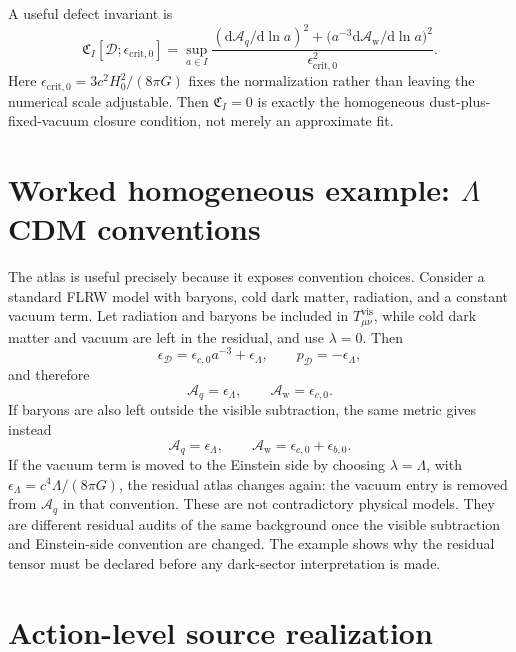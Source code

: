 \documentclass[
  aps,
  prd,
  reprint,
  superscriptaddress,
  floatfix,
  nofootinbib,
  longbibliography
]{revtex4-2}
\theoremstyle{plain}
\theoremstyle{definition}
\theoremstyle{remark}
\newcommand{\dd}{\mathrm d}
\newcommand{\D}{\mathcal D}
\newcommand{\vis}{\mathrm{vis}}
\newcommand{\crit}{\mathrm{crit}}
\newcommand{\Aq}{\mathcal A_q}
\newcommand{\Aw}{\mathcal A_{\mathrm w}}
\begin{document}
A useful defect invariant is
\begin{equation}
\boxed{
\mathfrak C_I[\D;\epsilon_{\crit,0}]
=\sup_{a\in I}
\frac{(\dd\Aq/\dd\ln a)^2+\bigl(a^{-3}\dd\Aw/\dd\ln a\bigr)^2}{\epsilon_{\crit,0}^{2}}.
}
\label{eq:defect}
\end{equation}
Here \(\epsilon_{\crit,0}=3c^2H_0^2/(8\pi G)\) fixes the normalization rather than leaving the numerical scale adjustable.  Then \(\mathfrak C_I=0\) is exactly the homogeneous dust-plus-fixed-vacuum closure condition, not merely an approximate fit.


\section{Worked homogeneous example: \texorpdfstring{\(\Lambda\)CDM}{LambdaCDM} conventions}

The atlas is useful precisely because it exposes convention choices.  Consider a standard FLRW model with baryons, cold dark matter, radiation, and a constant vacuum term.  Let radiation and baryons be included in \(T^{\vis}_{\mu\nu}\), while cold dark matter and vacuum are left in the residual, and use \(\lambda=0\).  Then
\begin{equation}
\epsilon_\D=\epsilon_{c,0}a^{-3}+\epsilon_\Lambda,
\qquad
p_\D=-\epsilon_\Lambda,
\end{equation}
and therefore
\begin{equation}
\boxed{
\Aq=\epsilon_\Lambda,
\qquad
\Aw=\epsilon_{c,0}.
}
\end{equation}
If baryons are also left outside the visible subtraction, the same metric gives instead
\begin{equation}
\Aq=\epsilon_\Lambda,
\qquad
\Aw=\epsilon_{c,0}+\epsilon_{b,0}.
\end{equation}
If the vacuum term is moved to the Einstein side by choosing \(\lambda=\Lambda\), with \(\epsilon_\Lambda=c^4\Lambda/(8\pi G)\), the residual atlas changes again: the vacuum entry is removed from \(\Aq\) in that convention.  These are not contradictory physical models.  They are different residual audits of the same background once the visible subtraction and Einstein-side convention are changed.  The example shows why the residual tensor must be declared before any dark-sector interpretation is made.

\section{Action-level source realization}
\end{document}
